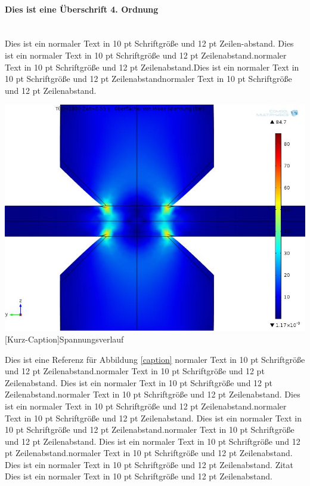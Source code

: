 \documentclass[10pt,a4paper,oneside,abstracton]{scrartcl}
\begin{document}
\begin{multicols}{2}
\paragraph{Dies ist eine Überschrift 4. Ordnung} $\;$\\%
Dies ist ein normaler Text in 10 pt Schriftgröße und 12 pt Zeilen-abstand. Dies ist ein normaler Text in 10 pt Schriftgröße und 12 pt Zeilenabstand.normaler Text in 10 pt Schriftgröße und 12 pt Zeilenabstand.Dies ist ein normaler Text in 10 pt Schriftgröße und 12 pt Zeilenabstandnormaler Text in 10 pt Schriftgröße und 12 pt Zeilenabstand.
	
	
\noindent%
\begin{minipage}{0.9\columnwidth}  %
\centering 
\resizebox{0.9\columnwidth}{!} 
{\includegraphics[width=\textwidth]{./Bilder/Testbild}} 
[Kurz-Caption]{Spannungsverlauf \label{caption}} 
\end{minipage} 

\vspace{4mm}

\hspace{-4mm}
Dies ist eine Referenz für Abbildung \ref{caption} normaler Text in 10 pt Schriftgröße und 12 pt Zeilenabstand.normaler Text in 10 pt Schriftgröße und 12 pt Zeilenabstand. Dies ist ein normaler Text in 10 pt Schriftgröße und 12 pt Zeilenabstand.normaler Text in 10 pt Schriftgröße und 12 pt Zeilenabstand. Dies ist ein normaler Text in 10 pt Schriftgröße und 12 pt Zeilenabstand.normaler Text in 10 pt Schriftgröße und 12 pt Zeilenabstand. Dies ist ein normaler Text in 10 pt Schriftgröße und 12 pt Zeilenabstand.normaler Text in 10 pt Schriftgröße und 12 pt Zeilenabstand. Dies ist ein normaler Text in 10 pt Schriftgröße und 12 pt Zeilenabstand.normaler Text in 10 pt Schriftgröße und 12 pt Zeilenabstand. Dies ist ein normaler Text in 10 pt Schriftgröße und 12 pt Zeilenabstand. Zitat
\cite{AnalogDev} %
Dies ist ein normaler Text in 10 pt Schriftgröße und 12 pt Zeilenabstand.



\end{multicols}
\end{document}
